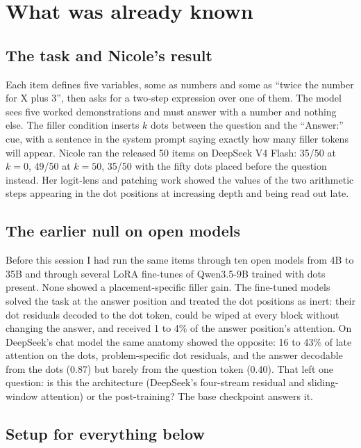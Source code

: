 \documentclass[11pt]{article}
\begin{document}
\tableofcontents

\section{What was already known}

\subsection{The task and Nicole's result}

Each item defines five variables, some as numbers and some as ``twice the number for X plus 3'', then asks for a two-step expression over one of them. The model sees five worked demonstrations and must answer with a number and nothing else. The filler condition inserts $k$ dots between the question and the ``Answer:'' cue, with a sentence in the system prompt saying exactly how many filler tokens will appear. Nicole ran the released 50 items on DeepSeek V4 Flash: 35/50 at $k=0$, 49/50 at $k=50$, 35/50 with the fifty dots placed before the question instead. Her logit-lens and patching work showed the values of the two arithmetic steps appearing in the dot positions at increasing depth and being read out late.

\subsection{The earlier null on open models}

Before this session I had run the same items through ten open models from 4B to 35B and through several LoRA fine-tunes of Qwen3.5-9B trained with dots present. None showed a placement-specific filler gain. The fine-tuned models solved the task at the answer position and treated the dot positions as inert: their dot residuals decoded to the dot token, could be wiped at every block without changing the answer, and received 1 to 4\% of the answer position's attention. On DeepSeek's chat model the same anatomy showed the opposite: 16 to 43\% of late attention on the dots, problem-specific dot residuals, and the answer decodable from the dots (0.87) but barely from the question token (0.40). That left one question: is this the architecture (DeepSeek's four-stream residual and sliding-window attention) or the post-training? The base checkpoint answers it.

\subsection{Setup for everything below}
\end{document}

